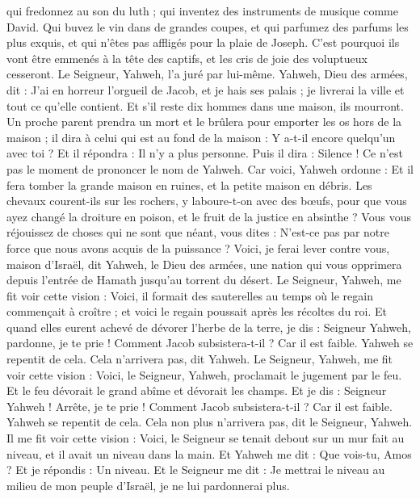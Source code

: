 \begin{multicols}{2}
qui fredonnez au son du luth ; qui inventez des instruments de musique comme David.
Qui buvez le vin dans de grandes coupes, et qui parfumez des parfums les plus exquis, et qui n’êtes pas affligés pour la plaie de Joseph.
C’est pourquoi ils vont être emmenés à la tête des captifs, et les cris de joie des voluptueux cesseront.
Le Seigneur, Yahweh, l’a juré par lui-même. Yahweh, Dieu des armées, dit : J'ai en horreur l'orgueil de Jacob, et je hais ses palais ; je livrerai la ville et tout ce qu’elle contient.
Et s'il reste dix hommes dans une maison, ils mourront.
Un proche parent prendra un mort et le brûlera pour emporter les os hors de la maison ; il dira à celui qui est au fond de la maison : Y a-t-il encore quelqu'un avec toi ? Et il répondra : Il n’y a plus personne. Puis il dira : Silence ! Ce n’est pas le moment de prononcer le nom de Yahweh.
Car voici, Yahweh ordonne : Et il fera tomber la grande maison en ruines, et la petite maison en débris.
Les chevaux courent-ils sur les rochers, y laboure-t-on avec des bœufs, pour que vous ayez changé la droiture en poison, et le fruit de la justice en absinthe ?
Vous vous réjouissez de choses qui ne sont que néant, vous dites : N’est-ce pas par notre force que nous avons acquis de la puissance ?
Voici, je ferai lever contre vous, maison d’Israël, dit Yahweh, le Dieu des armées, une nation qui vous opprimera depuis l'entrée de Hamath jusqu'au torrent du désert.
\VerseOne{}Le Seigneur, Yahweh, me fit voir cette vision : Voici, il formait des sauterelles au temps où le regain commençait à croître ; et voici le regain poussait après les récoltes du roi.
Et quand elles eurent achevé de dévorer l'herbe de la terre, je dis : Seigneur Yahweh, pardonne, je te prie ! Comment Jacob subsistera-t-il ? Car il est faible.
Yahweh se repentit de cela. Cela n'arrivera pas, dit Yahweh.
Le Seigneur, Yahweh, me fit voir cette vision : Voici, le Seigneur, Yahweh, proclamait le jugement par le feu. Et le feu dévorait le grand abîme et dévorait les champs.
Et je dis : Seigneur Yahweh ! Arrête, je te prie ! Comment Jacob subsistera-t-il ? Car il est faible.
Yahweh se repentit de cela. Cela non plus n'arrivera pas, dit le Seigneur, Yahweh.
Il me fit voir cette vision : Voici, le Seigneur se tenait debout sur un mur fait au niveau, et il avait un niveau dans la main.
Et Yahweh me dit : Que vois-tu, Amos ? Et je répondis : Un niveau. Et le Seigneur me dit : Je mettrai le niveau au milieu de mon peuple d'Israël, je ne lui pardonnerai plus.

\end{multicols}
